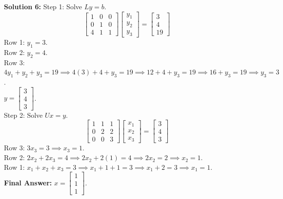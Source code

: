 \documentclass[11pt]{article}
\begin{document}
\vspace{0.5cm}
\textbf{Solution 6:}
Step 1: Solve $Ly = b$.
$$ \begin{bmatrix} 1 & 0 & 0 \\ 0 & 1 & 0 \\ 4 & 1 & 1 \end{bmatrix} \begin{bmatrix} y_1 \\ y_2 \\ y_3 \end{bmatrix} = \begin{bmatrix} 3 \\ 4 \\ 19 \end{bmatrix} $$
Row 1: $y_1 = 3$. \\
Row 2: $y_2 = 4$. \\
Row 3: $4y_1 + y_2 + y_3 = 19 \implies 4(3) + 4 + y_3 = 19 \implies 12 + 4 + y_3 = 19 \implies 16 + y_3 = 19 \implies y_3 = 3$. \\
$y = \begin{bmatrix} 3 \\ 4 \\ 3 \end{bmatrix}$. \\
Step 2: Solve $Ux = y$.
$$ \begin{bmatrix} 1 & 1 & 1 \\ 0 & 2 & 2 \\ 0 & 0 & 3 \end{bmatrix} \begin{bmatrix} x_1 \\ x_2 \\ x_3 \end{bmatrix} = \begin{bmatrix} 3 \\ 4 \\ 3 \end{bmatrix} $$
Row 3: $3x_3 = 3 \implies x_3 = 1$. \\
Row 2: $2x_2 + 2x_3 = 4 \implies 2x_2 + 2(1) = 4 \implies 2x_2 = 2 \implies x_2 = 1$. \\
Row 1: $x_1 + x_2 + x_3 = 3 \implies x_1 + 1 + 1 = 3 \implies x_1 + 2 = 3 \implies x_1 = 1$. \\
\textbf{Final Answer:} $x = \begin{bmatrix} 1 \\ 1 \\ 1 \end{bmatrix}$.
\end{document}
